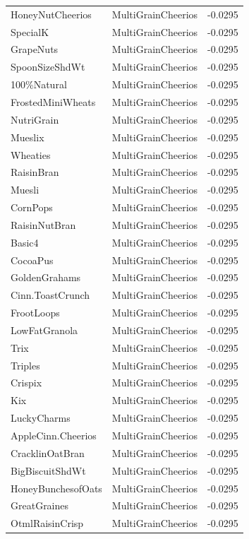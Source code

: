 \begin{table}[!htbp]
\begin{tabular}{lll}
\\
HoneyNutCheerios & MultiGrainCheerios & -0.0295
\\
SpecialK & MultiGrainCheerios & -0.0295
\\
GrapeNuts & MultiGrainCheerios & -0.0295
\\
SpoonSizeShdWt & MultiGrainCheerios & -0.0295
\\
100\%Natural & MultiGrainCheerios & -0.0295
\\
FrostedMiniWheats & MultiGrainCheerios & -0.0295
\\
NutriGrain & MultiGrainCheerios & -0.0295
\\
Mueslix & MultiGrainCheerios & -0.0295
\\
Wheaties & MultiGrainCheerios & -0.0295
\\
RaisinBran & MultiGrainCheerios & -0.0295
\\
Muesli & MultiGrainCheerios & -0.0295
\\
CornPops & MultiGrainCheerios & -0.0295
\\
RaisinNutBran & MultiGrainCheerios & -0.0295
\\
Basic4 & MultiGrainCheerios & -0.0295
\\
CocoaPus & MultiGrainCheerios & -0.0295
\\
GoldenGrahams & MultiGrainCheerios & -0.0295
\\
Cinn.ToastCrunch & MultiGrainCheerios & -0.0295
\\
FrootLoops & MultiGrainCheerios & -0.0295
\\
LowFatGranola & MultiGrainCheerios & -0.0295
\\
Trix & MultiGrainCheerios & -0.0295
\\
Triples & MultiGrainCheerios & -0.0295
\\
Crispix & MultiGrainCheerios & -0.0295
\\
Kix & MultiGrainCheerios & -0.0295
\\
LuckyCharms & MultiGrainCheerios & -0.0295
\\
AppleCinn.Cheerios & MultiGrainCheerios & -0.0295
\\
CracklinOatBran & MultiGrainCheerios & -0.0295
\\
BigBiscuitShdWt & MultiGrainCheerios & -0.0295
\\
HoneyBunchesofOats & MultiGrainCheerios & -0.0295
\\
GreatGraines & MultiGrainCheerios & -0.0295
\\
OtmlRaisinCrisp & MultiGrainCheerios & -0.0295
\\

\end{tabular}
\end{table}
